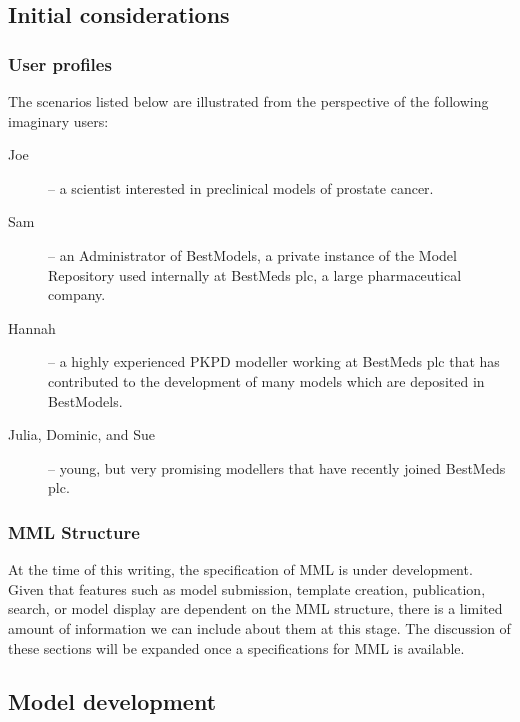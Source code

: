 \subsection{Initial considerations}
\subsubsection{User profiles}
\label{userProfiles}
The scenarios listed below are illustrated from the perspective of the following imaginary users:
\begin{description}
    \item[Joe] -- a scientist interested in preclinical models of prostate cancer.
    \item[Sam] -- an Administrator of BestModels, a private instance of the \ddmore Model Repository used internally at BestMeds plc, a large pharmaceutical company.
    \item[Hannah] -- a highly experienced PKPD modeller working at BestMeds plc that has contributed to the development of many models which are deposited in BestModels.
    \item[Julia, Dominic, and Sue] -- young, but very promising modellers that have recently joined BestMeds plc.
\end{description}

\subsubsection{MML Structure}
At the time of this writing, the specification of MML is under development. Given that features such as model submission, template creation, publication, search, or model display are dependent on the MML structure, there is a limited amount of information we can include about them at this stage. The discussion of these sections will be expanded once a specifications for MML is available.

\subsection{Model development}

